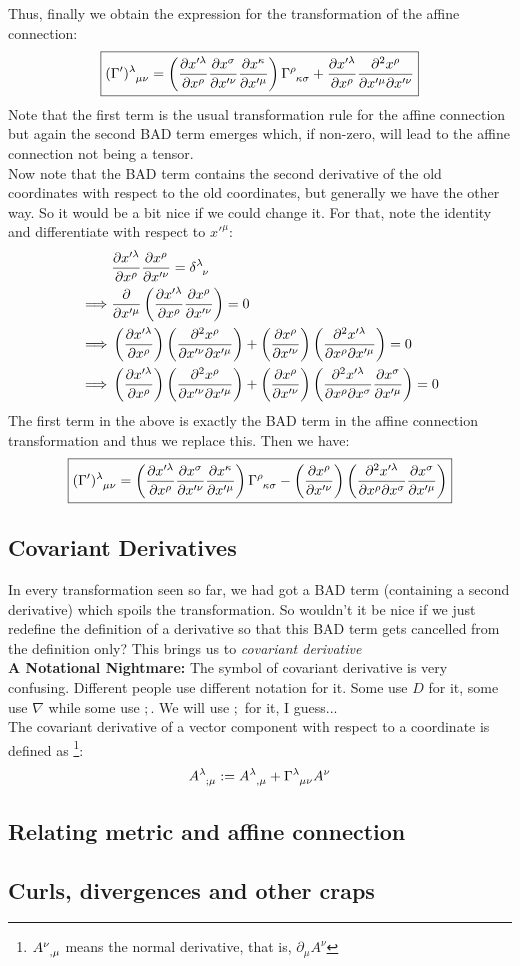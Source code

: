Thus, finally we obtain the expression for the transformation of the affine connection:
$$\boxed{ \tensor{(\Gamma')}{^\lambda _\mu _\nu} = \brac{\pdv{x'^\lambda}{x^\rho}\pdv{x^\sigma}{x'^\nu} \pdv{x^\kappa}{x'^\mu}}  \tensor{\Gamma}{^\rho _\kappa _\sigma} +\pdv{x'^\lambda}{x^\rho}\pdv{x^\rho}{x'^\mu}{x'^\nu} }$$
Note that the first term is the usual transformation rule for the affine connection but again the second BAD term emerges which, if non-zero, will lead to the affine connection not being a tensor.\\[0.3cm]
Now note that the BAD term contains the second derivative of the old coordinates with respect to the old coordinates, but generally we have the other way. So it would be a bit nice if we could change it. For that, note the identity and differentiate with respect to $x'^\mu$:
\begin{align*}
   &\pdv{x'^\lambda}{x^\rho}\pdv{x^\rho}{x'^\nu}=\tensor{\delta}{^\lambda_\nu}\\
\implies & \pdv{x'^\mu}\brac{\pdv{x'^\lambda}{x^\rho}\pdv{x^\rho}{x'^\nu}}=0\\
\implies & \brac{\pdv{x'^\lambda}{x^\rho}} \brac{\pdv{x^\rho}{x'^\nu}{x'^\mu} }+ \brac{\pdv{x^\rho}{x'^\nu}}\brac{\pdv{x'^\lambda}{x^\rho}{x'^\mu}}=0\\
\implies & \brac{\pdv{x'^\lambda}{x^\rho}} \brac{\pdv{x^\rho}{x'^\nu}{x'^\mu} } + \brac{\pdv{x^\rho}{x'^\nu}}\brac{\pdv{x'^\lambda}{x^\rho}{x^\sigma}\pdv{x^\sigma}{x'^\mu}}=0
\end{align*}
The first term in the above is exactly the BAD term in the affine connection transformation and thus we replace this. Then we have: 
$$\boxed{ \tensor{(\Gamma')}{^\lambda _\mu _\nu} = \brac{\pdv{x'^\lambda}{x^\rho}\pdv{x^\sigma}{x'^\nu} \pdv{x^\kappa}{x'^\mu}}  \tensor{\Gamma}{^\rho _\kappa _\sigma} - \brac{\pdv{x^\rho}{x'^\nu}}\brac{\pdv{x'^\lambda}{x^\rho}{x^\sigma}\pdv{x^\sigma}{x'^\mu}} }$$
\subsection{Covariant Derivatives}
In every transformation seen so far, we had got a BAD term (containing a second derivative) which spoils the transformation. So wouldn't it be nice if we just redefine the definition of a derivative so that this BAD term gets cancelled from the definition only? This brings us to \textit{covariant derivative} 
\\[0.3cm]
\textbf{A Notational Nightmare:}
The symbol of covariant derivative is very confusing. Different people use different notation for it. Some use $D$ for it, some use $\nabla$ while some use $;$. We will use $;$ for it, I guess...\\[0.3cm]
The covariant derivative of a vector component with respect to a coordinate is defined as \footnote{$\tensor{A}{^\nu _, _\mu}$ means the normal derivative, that is, $\partial_\mu A^\nu$}: 
$$\tensor{A}{^\lambda _; _\mu} :=  \tensor{A}{^\lambda _, _\mu} +\tensor{\Gamma}{^\lambda _\mu _\nu}A^\nu$$
\subsection{Relating metric and affine connection}
\subsection{Curls, divergences and other craps}